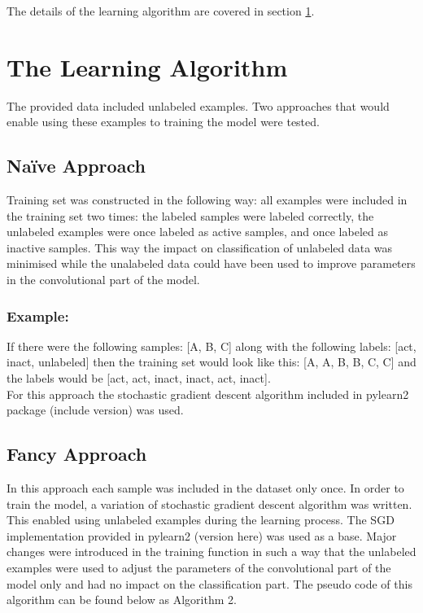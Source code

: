 \documentclass[a4paper,10pt]{report}
\begin{document}
	The details of the learning algorithm are covered in section \ref{sec:learning_algorithm}.	
	
      
    \section{The Learning Algorithm}\label{sec:learning_algorithm} 
    The provided data included unlabeled examples. Two approaches that would enable using these examples to training the model were tested.\\
    
      \subsection{Na\"{i}ve Approach}
      Training set was constructed in the following way: all examples were included in the training set two times: the labeled samples were labeled correctly, the unlabeled examples were once labeled as active samples, and once labeled as inactive samples. This way the impact on classification of unlabeled data was minimised while the unalabeled data could have been used to improve parameters in the convolutional part of the model.\\
	  
      \subsubsection{Example:}
      If there were the following samples: [A, B, C] along with the following labels: [act, inact, unlabeled] then the training set would look like this: [A, A, B, B, C, C] and the labels would be [act, act, inact, inact, act, inact].\\
      
      For this approach the stochastic gradient descent algorithm included in pylearn2 package (include version) was used.\\
	  
      \subsection{Fancy Approach}
      In this approach each sample was included in the dataset only once. In order to train the model, a variation of stochastic gradient descent algorithm was written. This enabled using unlabeled examples during the learning process. The SGD implementation provided in pylearn2 (version here) was used as a base. Major changes were introduced in the training function in such a way that the unlabeled examples were used to adjust the parameters of the convolutional part of the model only and had no impact on the classification part. The pseudo code of this algorithm can be found below as Algorithm 2.\\
      
\end{document}
